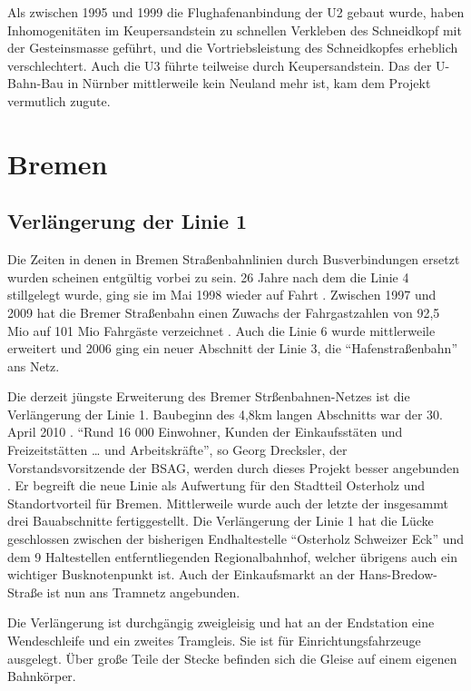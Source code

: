 Als zwischen 1995 und 1999 die Flughafenanbindung der U2 gebaut wurde, haben Inhomogenitäten im Keupersandstein zu schnellen Verkleben des Schneidkopf mit der Gesteinsmasse geführt, und die Vortriebsleistung des Schneidkopfes erheblich verschlechtert\cite{nbGeo}. Auch die U3 führte teilweise durch Keupersandstein\cite{nbRef3}. Das der U-Bahn-Bau in Nürnber mittlerweile kein Neuland mehr ist, kam dem Projekt vermutlich zugute.

\section{Bremen}
\subsection*{Verlängerung der Linie 1}

Die Zeiten in denen in Bremen Straßenbahnlinien durch Busverbindungen ersetzt wurden scheinen entgültig vorbei zu sein. 26 Jahre nach dem die Linie 4 stillgelegt wurde, ging sie im Mai 1998 wieder auf Fahrt \cite{bSv11}. Zwischen 1997 und 2009 hat die Bremer Straßenbahn einen Zuwachs der Fahrgastzahlen von 92,5 Mio auf 101 Mio Fahrgäste verzeichnet \cite{bNp10}. Auch die Linie 6 wurde mittlerweile erweitert und 2006 ging ein neuer Abschnitt der Linie 3, die ``Hafenstraßenbahn'' ans Netz. 

Die derzeit jüngste Erweiterung des Bremer Strßenbahnen-Netzes ist die Verlängerung der Linie 1. Baubeginn des 4,8km langen Abschnitts war der 30. April 2010 \cite{bNp10}. ``Rund 16 000 Einwohner, Kunden der Einkaufsstäten und Freizeitstätten {…} und Arbeitskräfte'', so Georg Drecksler, der Vorstandsvorsitzende der BSAG, werden durch dieses Projekt besser angebunden \cite{bNp10}. Er begreift die neue Linie als Aufwertung für den Stadtteil Osterholz und Standortvorteil für Bremen. Mittlerweile wurde auch der letzte der insgesammt drei Bauabschnitte\cite{bSv12} fertiggestellt. Die Verlängerung der Linie 1 hat die Lücke geschlossen zwischen der bisherigen Endhaltestelle ``Osterholz Schweizer Eck'' und dem 9 Haltestellen entferntliegenden Regionalbahnhof, welcher übrigens auch ein wichtiger Busknotenpunkt ist. Auch der Einkaufsmarkt an der Hans-Bredow-Straße ist nun ans Tramnetz angebunden.

Die Verlängerung ist durchgängig zweigleisig und hat an der Endstation eine Wendeschleife und ein zweites Tramgleis. Sie ist für Einrichtungsfahrzeuge ausgelegt. Über große Teile der Stecke befinden sich die Gleise auf einem eigenen Bahnkörper\cite{bBub11}. 


